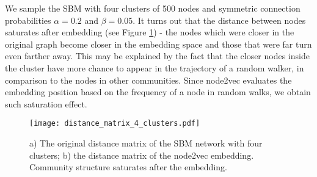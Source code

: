 We sample the SBM with four clusters of 500 nodes and symmetric connection probabilities $\alpha=0.2$ and $\beta = 0.05$. It turns out that the distance between nodes saturates after embedding (see Figure \ref{fig:distance_matrices}) - the nodes which were closer in the original graph become closer in the embedding space and those that were far turn even farther away. This may be explained by the fact that the closer nodes inside the cluster have more chance to appear in the trajectory of a random walker, in comparison to the nodes in other communities. Since node2vec evaluates the embedding position based on the frequency of a node in random walks, we obtain such saturation effect.

 \begin{figure}[ht]
 \centering
    \texttt{[image: distance\_matrix\_4\_clusters.pdf]}
    \caption{a) The original distance matrix of the SBM network with four clusters; b) the distance matrix of the node2vec embedding. Community structure saturates after the embedding.}
   \label{fig:distance_matrices}
 \end{figure}


